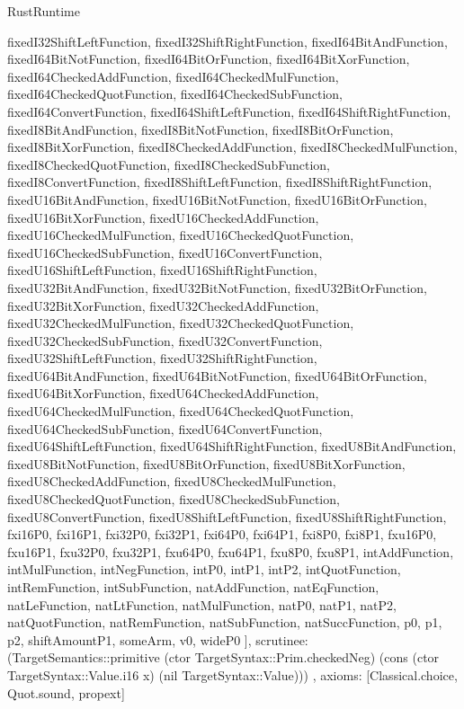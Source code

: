 \begin{lexlean}{RustRuntime}
\begin{semanticmodule}
{{      fixedI32ShiftLeftFunction,
      fixedI32ShiftRightFunction,
      fixedI64BitAndFunction,
      fixedI64BitNotFunction,
      fixedI64BitOrFunction,
      fixedI64BitXorFunction,
      fixedI64CheckedAddFunction,
      fixedI64CheckedMulFunction,
      fixedI64CheckedQuotFunction,
      fixedI64CheckedSubFunction,
      fixedI64ConvertFunction,
      fixedI64ShiftLeftFunction,
      fixedI64ShiftRightFunction,
      fixedI8BitAndFunction,
      fixedI8BitNotFunction,
      fixedI8BitOrFunction,
      fixedI8BitXorFunction,
      fixedI8CheckedAddFunction,
      fixedI8CheckedMulFunction,
      fixedI8CheckedQuotFunction,
      fixedI8CheckedSubFunction,
      fixedI8ConvertFunction,
      fixedI8ShiftLeftFunction,
      fixedI8ShiftRightFunction,
      fixedU16BitAndFunction,
      fixedU16BitNotFunction,
      fixedU16BitOrFunction,
      fixedU16BitXorFunction,
      fixedU16CheckedAddFunction,
      fixedU16CheckedMulFunction,
      fixedU16CheckedQuotFunction,
      fixedU16CheckedSubFunction,
      fixedU16ConvertFunction,
      fixedU16ShiftLeftFunction,
      fixedU16ShiftRightFunction,
      fixedU32BitAndFunction,
      fixedU32BitNotFunction,
      fixedU32BitOrFunction,
      fixedU32BitXorFunction,
      fixedU32CheckedAddFunction,
      fixedU32CheckedMulFunction,
      fixedU32CheckedQuotFunction,
      fixedU32CheckedSubFunction,
      fixedU32ConvertFunction,
      fixedU32ShiftLeftFunction,
      fixedU32ShiftRightFunction,
      fixedU64BitAndFunction,
      fixedU64BitNotFunction,
      fixedU64BitOrFunction,
      fixedU64BitXorFunction,
      fixedU64CheckedAddFunction,
      fixedU64CheckedMulFunction,
      fixedU64CheckedQuotFunction,
      fixedU64CheckedSubFunction,
      fixedU64ConvertFunction,
      fixedU64ShiftLeftFunction,
      fixedU64ShiftRightFunction,
      fixedU8BitAndFunction,
      fixedU8BitNotFunction,
      fixedU8BitOrFunction,
      fixedU8BitXorFunction,
      fixedU8CheckedAddFunction,
      fixedU8CheckedMulFunction,
      fixedU8CheckedQuotFunction,
      fixedU8CheckedSubFunction,
      fixedU8ConvertFunction,
      fixedU8ShiftLeftFunction,
      fixedU8ShiftRightFunction,
      fxi16P0,
      fxi16P1,
      fxi32P0,
      fxi32P1,
      fxi64P0,
      fxi64P1,
      fxi8P0,
      fxi8P1,
      fxu16P0,
      fxu16P1,
      fxu32P0,
      fxu32P1,
      fxu64P0,
      fxu64P1,
      fxu8P0,
      fxu8P1,
      intAddFunction,
      intMulFunction,
      intNegFunction,
      intP0,
      intP1,
      intP2,
      intQuotFunction,
      intRemFunction,
      intSubFunction,
      natAddFunction,
      natEqFunction,
      natLeFunction,
      natLtFunction,
      natMulFunction,
      natP0,
      natP1,
      natP2,
      natQuotFunction,
      natRemFunction,
      natSubFunction,
      natSuccFunction,
      p0,
      p1,
      p2,
      shiftAmountP1,
      someArm,
      v0,
      wideP0
    ],
    scrutinee: (TargetSemantics::primitive (ctor TargetSyntax::Prim.checkedNeg) (cons (ctor TargetSyntax::Value.i16 x) (nil TargetSyntax::Value)))
  },
  axioms: [Classical.choice, Quot.sound, propext]
}


\end{semanticmodule}
\end{lexlean}
